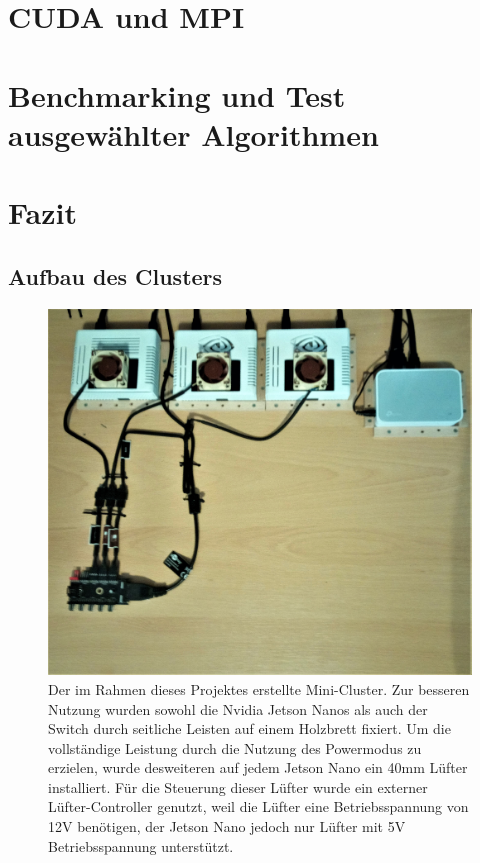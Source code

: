 \documentclass[doktyp=semarbeit, sprache=german]{TUBAFarbeiten}
\begin{document}
\section{CUDA und MPI}
\section{Benchmarking und Test ausgewählter Algorithmen}
\section{Fazit}
\newpage
{} 
\begin{appendix} 
\section{Aufbau des Clusters}
\begin{figure}
	\centering
	\includegraphics[width=1.0\textwidth]{images/Foto1.jpg}
	\caption{Der im Rahmen dieses Projektes erstellte Mini-Cluster. Zur besseren Nutzung wurden sowohl die Nvidia Jetson Nanos als auch der Switch durch seitliche Leisten auf einem Holzbrett fixiert. Um die vollständige Leistung durch die Nutzung des Powermodus zu erzielen, wurde desweiteren auf jedem Jetson Nano ein 40mm Lüfter installiert. Für die Steuerung dieser Lüfter wurde ein externer Lüfter-Controller genutzt, weil die Lüfter eine Betriebsspannung von 12V benötigen, der Jetson Nano jedoch nur Lüfter mit 5V Betriebsspannung unterstützt.}
	\label{img:foto1}
\end{figure}
\end{appendix}
\newpage
{}
\end{document}
